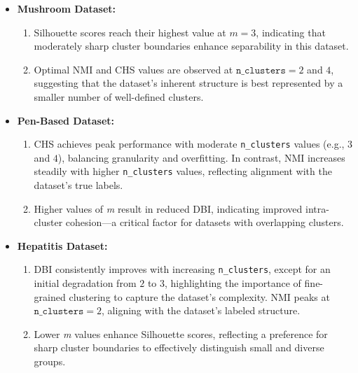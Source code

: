 \begin{itemize}
	\item \textbf{Mushroom Dataset:}
	\begin{enumerate}
		\item Silhouette scores reach their highest value at $m=3$, indicating
		that moderately sharp cluster boundaries enhance separability in this
		dataset.
		
		\item Optimal NMI and CHS values are observed at $\texttt{n\_clusters}=2$ and
		$4$, suggesting that the dataset's inherent structure is best
		represented by a smaller number of well-defined clusters.
	\end{enumerate}
	
	\item \textbf{Pen-Based Dataset:}
	\begin{enumerate}
		\item CHS achieves peak performance with moderate \texttt{n\_clusters}
		values (e.g., $3$ and $4$), balancing granularity and overfitting. In contrast, NMI increases steadily with higher \texttt{n\_clusters} values, reflecting alignment with the dataset's true labels.
		
		\item Higher values of \textit{m} result in reduced DBI, indicating improved
		intra-cluster cohesion—a critical factor for datasets with overlapping clusters.
	\end{enumerate}
	
	\item \textbf{Hepatitis Dataset:}
	\begin{enumerate}
		\item DBI consistently improves with increasing \texttt{n\_clusters}, except
		for an initial degradation from $2$ to $3$, highlighting the importance
		of fine-grained clustering to capture the dataset's complexity. NMI peaks
		at $\texttt{n\_clusters}=2$, aligning with the dataset's labeled
		structure.
		
		\item Lower \textit{m} values enhance Silhouette scores, reflecting a preference
		for sharp cluster boundaries to effectively distinguish small and diverse
		groups.
	\end{enumerate}
\end{itemize}

